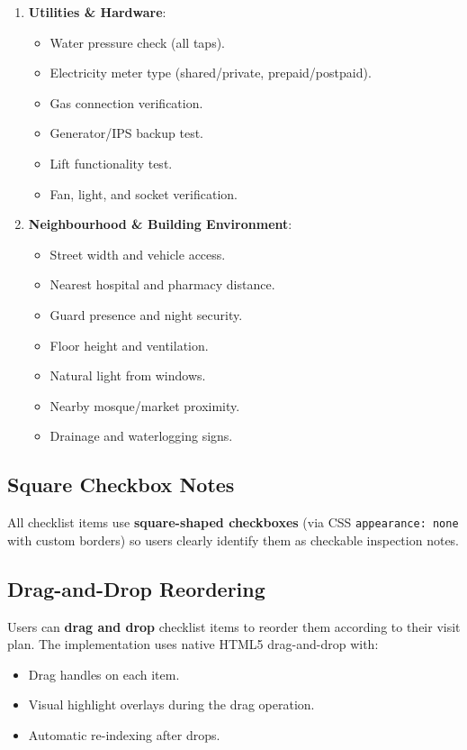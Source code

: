 \documentclass[12pt, a4paper, oneside]{report}
\begin{document}
\begin{enumerate}[leftmargin=2em]
  \item \textbf{Utilities \& Hardware}:
  \begin{itemize}
    \item Water pressure check (all taps).
    \item Electricity meter type (shared/private, prepaid/postpaid).
    \item Gas connection verification.
    \item Generator/IPS backup test.
    \item Lift functionality test.
    \item Fan, light, and socket verification.
  \end{itemize}

  \item \textbf{Neighbourhood \& Building Environment}:
  \begin{itemize}
    \item Street width and vehicle access.
    \item Nearest hospital and pharmacy distance.
    \item Guard presence and night security.
    \item Floor height and ventilation.
    \item Natural light from windows.
    \item Nearby mosque/market proximity.
    \item Drainage and waterlogging signs.
  \end{itemize}
\end{enumerate}

\subsection{Square Checkbox Notes}

All checklist items use \textbf{square-shaped checkboxes} (via CSS \texttt{appearance: none} with custom borders) so users clearly identify them as checkable inspection notes.

\subsection{Drag-and-Drop Reordering}

Users can \textbf{drag and drop} checklist items to reorder them according to their visit plan. The implementation uses native HTML5 drag-and-drop with:

\begin{itemize}[leftmargin=2em]
  \item Drag handles on each item.
  \item Visual highlight overlays during the drag operation.
  \item Automatic re-indexing after drops.
\end{itemize}
\end{document}
